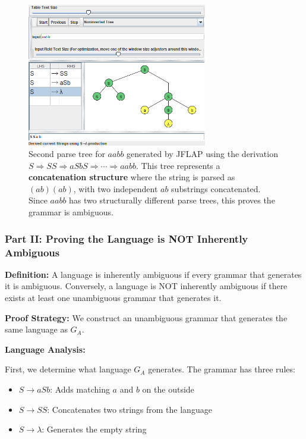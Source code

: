 \documentclass[12pt]{article}
\begin{document}
\begin{figure}[H]
\centering
\includegraphics[width=0.7\textwidth]{Problem 4/Ambiguous Grammar Tree 2 (SS First).png}
\caption{Second parse tree for $aabb$ generated by JFLAP using the derivation $S \Rightarrow SS \Rightarrow aSbS \Rightarrow \cdots \Rightarrow aabb$. This tree represents a \textbf{concatenation structure} where the string is parsed as $(ab)(ab)$, with two independent $ab$ substrings concatenated. Since $aabb$ has two structurally different parse trees, this proves the grammar is ambiguous.}
\label{fig:problem4_tree2}
\end{figure}

\subsubsection{Part II: Proving the Language is NOT Inherently Ambiguous}

\textbf{Definition:} A language is inherently ambiguous if every grammar that generates it is ambiguous. Conversely, a language is NOT inherently ambiguous if there exists at least one unambiguous grammar that generates it.

\textbf{Proof Strategy:} We construct an unambiguous grammar that generates the same language as $G_A$.

\textbf{Language Analysis:}

First, we determine what language $G_A$ generates. The grammar has three rules:
\begin{itemize}
\item $S \rightarrow aSb$: Adds matching $a$ and $b$ on the outside
\item $S \rightarrow SS$: Concatenates two strings from the language
\item $S \rightarrow \lambda$: Generates the empty string
\end{itemize}
\end{document}
